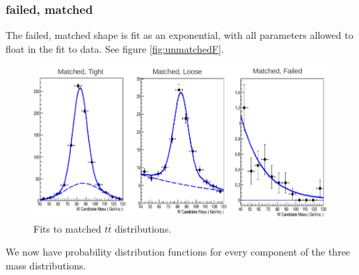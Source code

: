 \subsubsection*{failed, matched}
The failed, matched shape is fit as an exponential, with all parameters allowed to float in the fit to data. See figure \ref{fig:unmatchedF}.
\begin{figure}[h!]
\centering
\includegraphics[scale=0.5]{EXO-12-024/figs/WtagSF/matched_fits.png}
\caption{Fits to matched $t\overline{t}$ distributions.}\label{fig:matchedF}
\end{figure}
We now have probability distribution functions for every component of the three mass distributions.
